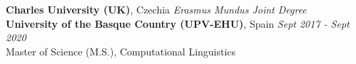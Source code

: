
{\textbf{Charles University (UK)}}, Czechia \hfill
        {\textit{Erasmus Mundus Joint Degree}}\\
{\textbf{University of the Basque Country (UPV-EHU)}, Spain} \hfill
    {\textit{Sept 2017 - Sept 2020}}\\
        Master of Science (M.S.), Computational Linguistics